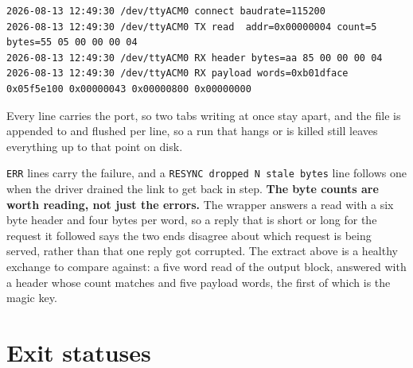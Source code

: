 \documentclass[../manual.tex]{subfiles}
\begin{document}
\begin{lstlisting}
2026-08-13 12:49:30 /dev/ttyACM0 connect baudrate=115200
2026-08-13 12:49:30 /dev/ttyACM0 TX read  addr=0x00000004 count=5 bytes=55 05 00 00 00 04
2026-08-13 12:49:30 /dev/ttyACM0 RX header bytes=aa 85 00 00 00 04
2026-08-13 12:49:30 /dev/ttyACM0 RX payload words=0xb01dface 0x05f5e100 0x00000043 0x00000800 0x00000000
\end{lstlisting}

Every line carries the port, so two tabs writing at once stay apart, and the file is appended to and flushed per line, so a run that hangs or is killed still leaves everything up to that point on disk.

\texttt{ERR} lines carry the failure, and a \texttt{RESYNC dropped N stale bytes} line follows one when the driver drained the link to get back in step. \textbf{The byte counts are worth reading, not just the errors.} The wrapper answers a read with a six byte header and four bytes per word, so a reply that is short or long for the request it followed says the two ends disagree about which request is being served, rather than that one reply got corrupted. The extract above is a healthy exchange to compare against: a five word read of the output block, answered with a header whose count matches and five payload words, the first of which is the magic key.

\section{Exit statuses}
\label{sec:cli_exit}
\end{document}
